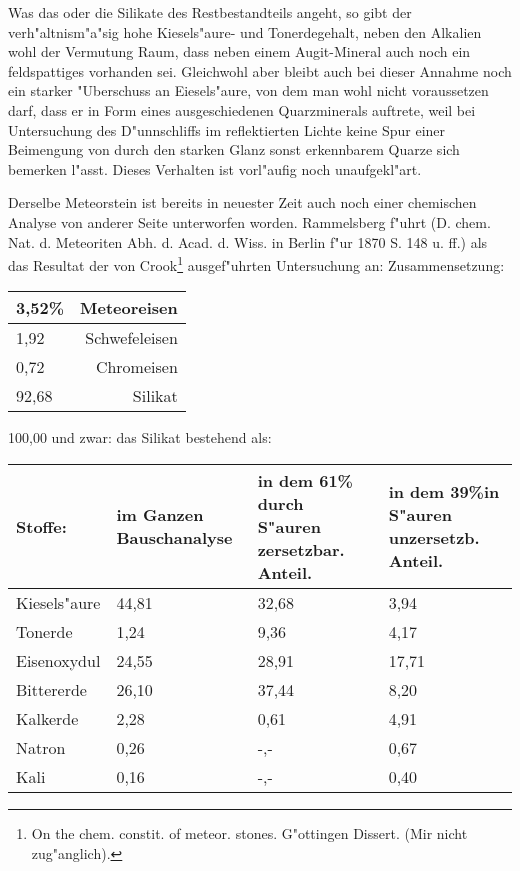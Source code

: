\documentclass[a4paper, 11pt, oneside]{article}
\begin{document}
Was das oder die Silikate des Restbestandteils angeht, so gibt der verh"altnism"a"sig hohe Kiesels"aure- und Tonerdegehalt, neben den Alkalien wohl der Vermutung Raum, dass neben einem Augit-Mineral auch noch ein feldspattiges vorhanden sei. Gleichwohl aber bleibt auch bei dieser Annahme noch ein starker "Uberschuss an Eiesels"aure, von dem man wohl nicht voraussetzen darf, dass er in Form eines ausgeschiedenen Quarzminerals auftrete, weil bei Untersuchung des D"unnschliffs im reflektierten Lichte keine Spur einer Beimengung von durch den starken Glanz sonst erkennbarem Quarze sich bemerken l"asst. Dieses Verhalten ist vorl"aufig noch unaufgekl"art.

Derselbe Meteorstein ist bereits in neuester Zeit auch noch einer chemischen Analyse von anderer Seite unterworfen worden. Rammelsberg f"uhrt (D. chem. Nat. d. Meteoriten Abh. d. Acad. d. Wiss. in Berlin f"ur 1870 S. 148 u. ff.) als das Resultat der von Crook\footnote{On the chem. constit. of meteor. stones. G"ottingen Dissert. (Mir nicht zug"anglich).} ausgef"uhrten Untersuchung an: Zusammensetzung:
\begin{center}
    \begin{tabular}{ |l|r| } 
    \hline
    3,52\% & Meteoreisen\\\hline
    1,92 & Schwefeleisen\\\hline
    0,72 & Chromeisen\\\hline
    92,68 & Silikat\\
    \hline
    \end{tabular}
\end{center}
100,00 und zwar:
das Silikat bestehend als:
\begin{center}
\begin{tabular}{ |p{20mm}|p{24mm}|p{31mm}|p{32mm}| }
    \hline
    Stoffe: & im Ganzen Bauschanalyse & in dem 61\% durch S"auren zersetzbar. Anteil. & in dem 39\%\newline in S"auren unzersetzb. Anteil.\\
    \hline\hline
    Kiesels"aure & 44,81 & 32,68 & 3,94\\\hline
    Tonerde & 1,24 & 9,36 & 4,17\\\hline
    Eisenoxydul & 24,55 & 28,91 & 17,71\\\hline
    Bittererde & 26,10 & 37,44 & 8,20\\\hline
    Kalkerde & 2,28 & 0,61 & 4,91\\\hline
    Natron & 0,26 & -,- & 0,67\\\hline
    Kali & 0,16 & -,- & 0,40\\
    \hline
\end{tabular}
\end{center}
\end{document}
